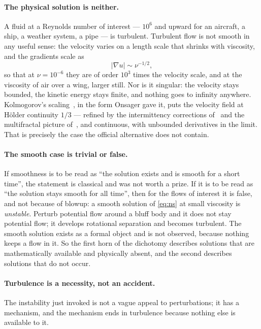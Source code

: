 \documentclass[11pt]{article}
\newcommand{\grad}{\nabla}
\begin{document}
\paragraph{The physical solution is neither.} A fluid at a Reynolds number of interest --- $10^6$
and upward for an aircraft, a ship, a weather system, a pipe --- is turbulent. Turbulent flow is not
smooth in any useful sense: the velocity varies on a length scale that shrinks with viscosity, and
the gradients scale as
\begin{equation}\label{eq:grad}
|\grad u| \sim \nu^{-1/2},
\end{equation}
so that at $\nu=10^{-6}$ they are of order $10^{3}$ times the velocity scale, and at the viscosity of
air over a wing, larger still. Nor is it singular: the velocity stays bounded, the kinetic energy
stays finite, and nothing goes to infinity anywhere. Kolmogorov's scaling~\cite{kolmogorov41,obukhov41}, in the form Onsager gave
it, puts the velocity field at H\"older continuity $1/3$ --- refined by the intermittency
corrections of~\cite{kolmogorov62,obukhov62} and the multifractal picture of~\cite{frischparisi},
and continuous, with unbounded derivatives
in the limit. That is precisely the case the official alternative does not contain.

\paragraph{The smooth case is trivial or false.} If smoothness is to be read as ``the solution
exists and is smooth for a short time'', the statement is classical and was not worth a prize. If it
is to be read as ``the solution stays smooth for all time'', then for the flows of interest it is
false, and not because of blowup: a smooth solution of \eqref{eq:ns} at small viscosity is
\emph{unstable}. Perturb potential flow around a bluff body and it does not stay potential flow; it
develops rotational separation and becomes turbulent. The smooth solution exists as a formal object
and is not observed, because nothing keeps a flow in it. So the first horn of the dichotomy
describes solutions that are mathematically available and physically absent, and the second
describes solutions that do not occur.

\paragraph{Turbulence is a necessity, not an accident.} The instability just invoked is not a vague
appeal to perturbations; it has a mechanism, and the mechanism ends in turbulence because nothing else
is available to it.
\end{document}
